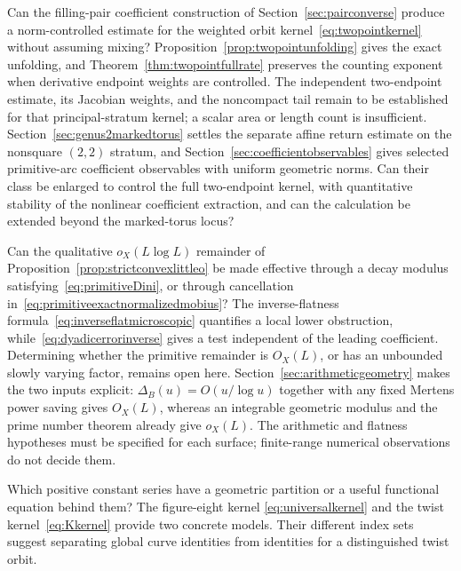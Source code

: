\begin{question}
Can the filling-pair coefficient construction of
Section~\ref{sec:pairconverse} produce a norm-controlled estimate
for the weighted orbit kernel~\eqref{eq:twopointkernel} without
assuming mixing? Proposition~\ref{prop:twopointunfolding} gives the
exact unfolding, and Theorem~\ref{thm:twopointfullrate} preserves
the counting exponent when derivative endpoint weights are controlled. The independent
two-endpoint estimate, its Jacobian weights, and the noncompact tail
remain to be established for that principal-stratum kernel; a scalar
area or length count is insufficient. Section~\ref{sec:genus2markedtorus}
settles the separate affine return estimate on the nonsquare $(2,2)$
stratum, and Section~\ref{sec:coefficientobservables} gives selected
primitive-arc coefficient observables with uniform geometric norms.
Can their class be enlarged to control the full two-endpoint kernel,
with quantitative stability of the nonlinear coefficient extraction,
and can the calculation be extended beyond the marked-torus locus?
\end{question}

\begin{question}
Can the qualitative $o_X(L\log L)$ remainder of
Proposition~\ref{prop:strictconvexlittleo} be made effective through a
decay modulus satisfying~\eqref{eq:primitiveDini}, or through cancellation
in~\eqref{eq:primitiveexactnormalizedmobius}? The inverse-flatness
formula~\eqref{eq:inverseflatmicroscopic} quantifies a local lower
obstruction, while~\eqref{eq:dyadicerrorinverse} gives a test independent
of the leading coefficient. Determining whether the primitive remainder
is $O_X(L)$, or has an unbounded slowly varying factor, remains open here.
Section~\ref{sec:arithmeticgeometry} makes the two inputs explicit:
$\Delta_B(u)=O(u/\log u)$ together with any fixed Mertens power
saving gives $O_X(L)$, whereas an integrable geometric modulus and
the prime number theorem already give $o_X(L)$.
The arithmetic and flatness hypotheses must be specified for each surface;
finite-range numerical observations do not decide them.
\end{question}

\begin{question}
Which positive constant series have a geometric partition or a useful
functional equation behind them? The figure-eight kernel
\eqref{eq:universalkernel} and the twist kernel~\eqref{eq:Kkernel} provide
two concrete models. Their different index sets suggest separating
global curve identities from identities for a distinguished twist orbit.
\end{question}

